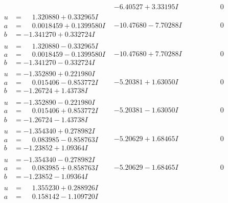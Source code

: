 \documentclass[1p]{elsarticle_modified}
\theoremstyle{definition}
\begin{document}
$$\begin{array}{c|c|c}
 & -6.40527 + 3.33195 I & \phantom{-0.000000 } 0 \\ \hline\begin{aligned}
u &= \phantom{-}1.320880 + 0.332965 I \\
a &= \phantom{-}0.0018459 + 0.1399580 I \\
b &= -1.341270 + 0.332724 I\end{aligned}
 & -10.47680 - 7.70288 I & \phantom{-0.000000 } 0 \\ \hline\begin{aligned}
u &= \phantom{-}1.320880 - 0.332965 I \\
a &= \phantom{-}0.0018459 - 0.1399580 I \\
b &= -1.341270 - 0.332724 I\end{aligned}
 & -10.47680 + 7.70288 I & \phantom{-0.000000 } 0 \\ \hline\begin{aligned}
u &= -1.352890 + 0.221980 I \\
a &= \phantom{-}0.015406 - 0.853772 I \\
b &= -1.26724 + 1.43738 I\end{aligned}
 & -5.20381 + 1.63050 I & \phantom{-0.000000 } 0 \\ \hline\begin{aligned}
u &= -1.352890 - 0.221980 I \\
a &= \phantom{-}0.015406 + 0.853772 I \\
b &= -1.26724 - 1.43738 I\end{aligned}
 & -5.20381 - 1.63050 I & \phantom{-0.000000 } 0 \\ \hline\begin{aligned}
u &= -1.354340 + 0.278982 I \\
a &= \phantom{-}0.083985 - 0.858763 I \\
b &= -1.23852 + 1.09364 I\end{aligned}
 & -5.20629 + 1.68465 I & \phantom{-0.000000 } 0 \\ \hline\begin{aligned}
u &= -1.354340 - 0.278982 I \\
a &= \phantom{-}0.083985 + 0.858763 I \\
b &= -1.23852 - 1.09364 I\end{aligned}
 & -5.20629 - 1.68465 I & \phantom{-0.000000 } 0 \\ \hline\begin{aligned}
u &= \phantom{-}1.355230 + 0.288926 I \\
a &= \phantom{-}0.158142 - 1.109720 I \\

\end{aligned}
\end{array}$$
\end{document}
